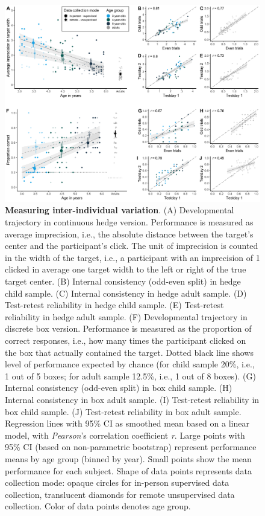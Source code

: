 \documentclass[
  man,floatsintext]{apa6}
\begin{document}
\begin{figure}

{\centering \includegraphics[width=1\linewidth]{../figures/gafo_results} 

}

\caption{\textbf{Measuring inter-individual variation}.
(A) Developmental trajectory in continuous hedge version. Performance is measured as average imprecision, i.e., the absolute distance between the target's center and the participant's click. The unit of imprecision is counted in the width of the target, i.e., a participant with an imprecision of 1 clicked in average one target width to the left or right of the true target center.
(B) Internal consistency (odd-even split) in hedge child sample. (C) Internal consistency in hedge adult sample. (D) Test-retest reliability in hedge child sample. (E) Test-retest reliability in hedge adult sample.
(F) Developmental trajectory in discrete box version. Performance is measured as the proportion of correct responses, i.e., how many times the participant clicked on the box that actually contained the target. Dotted black line shows level of performance expected by chance (for child sample 20\%, i.e., 1 out of 5 boxes; for adult sample 12.5\%, i.e., 1 out of 8 boxes).
(G) Internal consistency (odd-even split) in box child sample. (H) Internal consistency in box adult sample. (I) Test-retest reliability in box child sample. (J) Test-retest reliability in box adult sample.
Regression lines with 95\% CI as smoothed mean based on a linear model, with \emph{Pearson}'s correlation coefficient \emph{r}.
Large points with 95\% CI (based on non-parametric bootstrap) represent performance means by age group (binned by year).
Small points show the mean performance for each subject. Shape of data points represents data collection mode: opaque circles for in-person supervised data collection, translucent diamonds for remote unsupervised data collection. Color of data points denotes age group.}\label{fig:fig2}
\end{figure}
\end{document}
